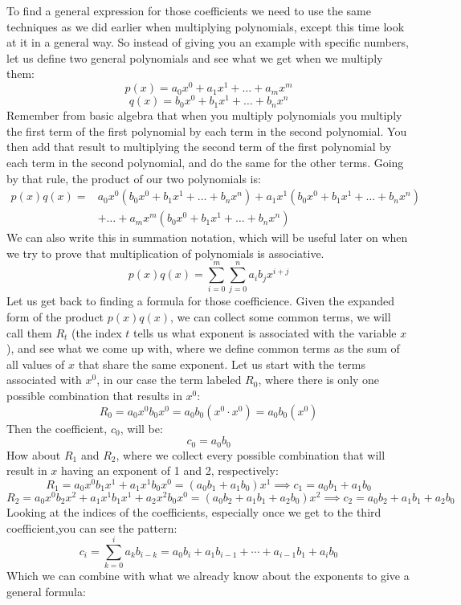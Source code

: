 To find a general expression for those coefficients we need to use the same techniques as we did earlier when multiplying polynomials, except this time look at it in a general way.  So instead of giving you an example with specific numbers, let us define two general polynomials and see what we get when we multiply them:
\[ p(x)=a_0x^0 + a_1x^1 + \ldots + a_mx^m \]
\[ q(x)=b_0x^0 + b_1x^1 + \ldots + b_nx^n \]
Remember from basic algebra that when you multiply polynomials you multiply the first term of the first polynomial by each term in the second polynomial.  You then add that result to multiplying the second term of the first polynomial by each term in the second polynomial, and do the same for the other terms.  Going by that rule, the product of our two polynomials is:
\begin{align*}
p(x)q(x)=& a_0x^0(b_0x^0+b_1x^1+ \ldots + b_nx^n) + a_1x^1(b_0x^0+b_1x^1+ \ldots + b_nx^n) \\
&+ \ldots + a_mx^m(b_0x^0+b_1x^1+ \ldots + b_nx^n) 
\end{align*}
We can also write this in summation notation, which will be useful later on when we try to prove that multiplication of polynomials is associative.
\[
p(x) q(x) =\sum_{i=0}^{m}\sum_{j=0}^{n}a_i b_j x^{i+j}
\]
Let us get back to finding a formula for those coefficience.  Given the expanded form of the product $p(x)q(x)$, we can collect some common terms, we will call them $R_t$ (the index $t$ tells us what exponent is associated with the variable $x$), and see what we come up with, where we define common terms as the sum of all values of $x$ that share the same exponent.  Let us start with the terms associated with $x^0$, in our case the term labeled $R_0$, where there is only one possible combination that results in $x^0$:
\[ R_0=a_0x^0b_0x^0 = a_0b_0(x^0\cdot x^0)=a_0b_0(x^0) \]
Then the coefficient, $c_0$, will be:
\[ c_0= a_0b_0 \]
How about $R_1$ and $R_2$, where we collect every possible combination that will result in $x$ having an exponent of 1 and 2, respectively:
\[ R_1= a_0x^0b_1x^1 + a_1x^1b_0x^0 = (a_0b_1+a_1b_0)x^1  \implies c_1= a_0b_1+a_1b_0 \]
\[R_2= a_0x^0b_2x^2 + a_1x^1b_1x^1 + a_2x^2b_0x^0 = (a_0b_2 + a_1b_1 +a_2b_0)x^2 \implies c_2 = a_0b_2 + a_1b_1 +a_2b_0 \]
Looking at the indices of the coefficients, especially once we get to the third coefficient,you can see the pattern:  
\[
c_i = \sum_{k = 0}^i a_k b_{i - k} = a_0  b_i + a_1 b_{i -1} + \cdots + a_{i -1} b _1 + a_i b_0
\]
Which we can combine with what we already know about the exponents to give a general formula:

